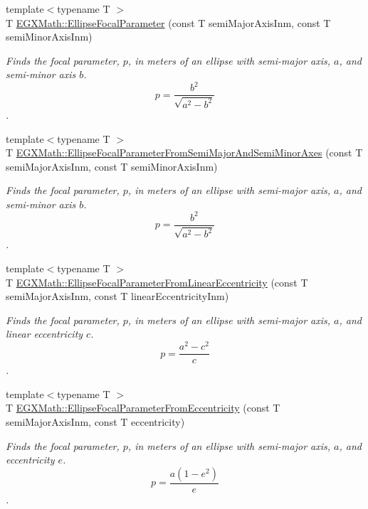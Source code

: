 \begin{DoxyCompactItemize}
\item 
{\footnotesize template$<$typename T $>$ }\\T \mbox{\hyperlink{group___e_g_x_math-_geometry-2_d-_ellipse-_focal_parameter_ga4cd01a38c72c092ef9791351948bf69b}{E\+G\+X\+Math\+::\+Ellipse\+Focal\+Parameter}} (const T semi\+Major\+Axis\+Inm, const T semi\+Minor\+Axis\+Inm)
\begin{DoxyCompactList}\small\item\em Finds the focal parameter, $p$, in meters of an ellipse with semi-\/major axis, $a$, and semi-\/minor axis $b$. \[ p=\frac{b^2}{\sqrt{a^2-b^2}} \]. \end{DoxyCompactList}\item 
{\footnotesize template$<$typename T $>$ }\\T \mbox{\hyperlink{group___e_g_x_math-_geometry-2_d-_ellipse-_focal_parameter_ga406c026954d4f5b357e0310461ed4d1d}{E\+G\+X\+Math\+::\+Ellipse\+Focal\+Parameter\+From\+Semi\+Major\+And\+Semi\+Minor\+Axes}} (const T semi\+Major\+Axis\+Inm, const T semi\+Minor\+Axis\+Inm)
\begin{DoxyCompactList}\small\item\em Finds the focal parameter, $p$, in meters of an ellipse with semi-\/major axis, $a$, and semi-\/minor axis $b$. \[ p=\frac{b^2}{\sqrt{a^2-b^2}} \]. \end{DoxyCompactList}\item 
{\footnotesize template$<$typename T $>$ }\\T \mbox{\hyperlink{group___e_g_x_math-_geometry-2_d-_ellipse-_focal_parameter_ga61d3b31a8a32b43634b2ea89a83bc6a5}{E\+G\+X\+Math\+::\+Ellipse\+Focal\+Parameter\+From\+Linear\+Eccentricity}} (const T semi\+Major\+Axis\+Inm, const T linear\+Eccentricity\+Inm)
\begin{DoxyCompactList}\small\item\em Finds the focal parameter, $p$, in meters of an ellipse with semi-\/major axis, $a$, and linear eccentricity $c$. \[ p=\frac{a^2-c^2}{c} \]. \end{DoxyCompactList}\item 
{\footnotesize template$<$typename T $>$ }\\T \mbox{\hyperlink{group___e_g_x_math-_geometry-2_d-_ellipse-_focal_parameter_gafd838410a3f813315166c64b53e0e25b}{E\+G\+X\+Math\+::\+Ellipse\+Focal\+Parameter\+From\+Eccentricity}} (const T semi\+Major\+Axis\+Inm, const T eccentricity)
\begin{DoxyCompactList}\small\item\em Finds the focal parameter, $p$, in meters of an ellipse with semi-\/major axis, $a$, and eccentricity $e$. \[ p=\frac{a(1-e^2)}{e} \]. \end{DoxyCompactList}\item 

\end{DoxyCompactItemize}
